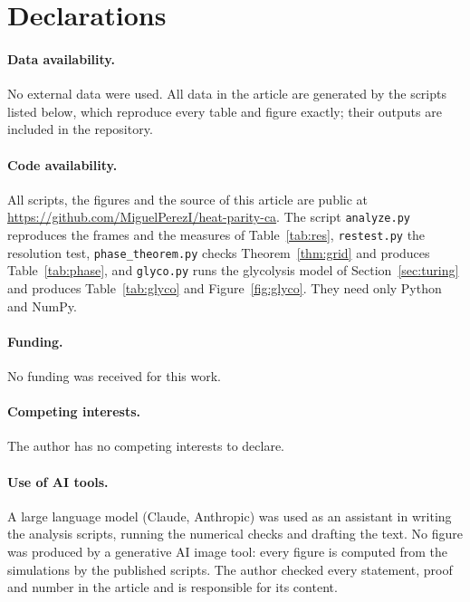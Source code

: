\documentclass[11pt,a4paper]{article}
\theoremstyle{definition}
\theoremstyle{remark}
\begin{document}
\section*{Declarations}

\paragraph{Data availability.} No external data were used. All data
in the article are generated by the scripts listed below, which
reproduce every table and figure exactly; their outputs are included in
the repository.

\paragraph{Code availability.} All scripts, the figures and the source
of this article are public at
\url{https://github.com/MiguelPerezI/heat-parity-ca}. The script
\texttt{analyze.py} reproduces the frames and the measures of
Table~\ref{tab:res}, \texttt{restest.py} the resolution test,
\texttt{phase\_theorem.py} checks Theorem~\ref{thm:grid} and produces
Table~\ref{tab:phase}, and \texttt{glyco.py} runs the glycolysis model
of Section~\ref{sec:turing} and produces Table~\ref{tab:glyco} and
Figure~\ref{fig:glyco}. They need only Python and NumPy.

\paragraph{Funding.} No funding was received for this work.

\paragraph{Competing interests.} The author has no competing interests
to declare.

\paragraph{Use of AI tools.} A large language model (Claude, Anthropic)
was used as an assistant in writing the analysis scripts, running the
numerical checks and drafting the text. No figure was produced by a
generative AI image tool: every figure is computed from the simulations
by the published scripts. The author checked every
statement, proof and number in the article and is responsible for its
content.
\end{document}
